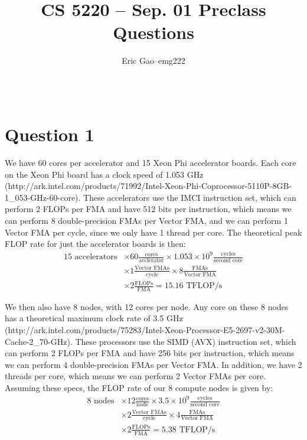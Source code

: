 \documentclass[11pt]{article}
\title{CS 5220 -- Sep. 01 Preclass Questions} %
\author{
  \begin{tabular}{l c l}
    Eric Gao & -- & emg222\\
  \end{tabular}\\
  \rule{\linewidth}{0.4pt}
}
\date{}
\begin{document}
    \thispagestyle{empty}
    \maketitle

    \section*{Question 1}
        We have 60 cores per accelerator and 15 Xeon Phi accelerator boards. Each core on the Xeon Phi board has a clock speed of 1.053 GHz (http://ark.intel.com/products/71992/Intel-Xeon-Phi-Coprocessor-5110P-8GB-1\_053-GHz-60-core). These accelerators use the IMCI instruction set, which can perform 2 FLOPs per FMA and have 512 bits per instruction, which means we can perform 8 double-precision FMAs per Vector FMA, and we can perform 1 Vector FMA per cycle, since we only have 1 thread per core. The theoretical peak FLOP rate for just the accelerator boards is then:
        \begin{align*}
            15 \text{ accelerators} &\times 60 \frac{ \text{cores} }{ \text{acclerator} } \times 1.053\times 10^9 \frac{ \text{cycles} }{ \text{second core} } \\[0.5em]
                                    &\times 1 \frac{ \text{Vector FMAs} }{\text{cycle} }  \times 8 \frac{ \text{FMAs}}{\text{Vector FMA}}\\[0.5em]
                                    &\times 2 \frac{\text{FLOPs}}{\text{FMA}} = 15.16 \text{ TFLOP/s}
        \end{align*}

        We then also have 8 nodes, with 12 cores per node. Any core on these 8 nodes has a theoretical maximum clock rate of 3.5 GHz (http://ark.intel.com/products/75283/Intel-Xeon-Processor-E5-2697-v2-30M-Cache-2\_70-GHz). These processors use the SIMD (AVX) instruction set, which can perform 2 FLOPs per FMA and have 256 bits per instruction, which means we can perform 4 double-precision FMAs per Vector FMA. In addition, we have 2 threads per core, which means we can perform 2 Vector FMAs per core. Assuming these specs, the FLOP rate of our 8 compute nodes is given by:
        \begin{align*}
            8 \text{ nodes} &\times 12 \frac{\text{cores}}{\text{node}} \times 3.5\times 10^9 \frac{\text{cycles}}{\text{second core}}\\[0.5em] 
                            &\times 2 \frac{ \text{Vector FMAs} }{\text{cycle} }  \times 4 \frac{ \text{FMAs}}{\text{Vector FMA}}\\[0.5em]
                            &\times 2 \frac{\text{FLOPs}}{\text{FMA}} = 5.38 \text{ TFLOP/s}
        \end{align*}
\end{document}
